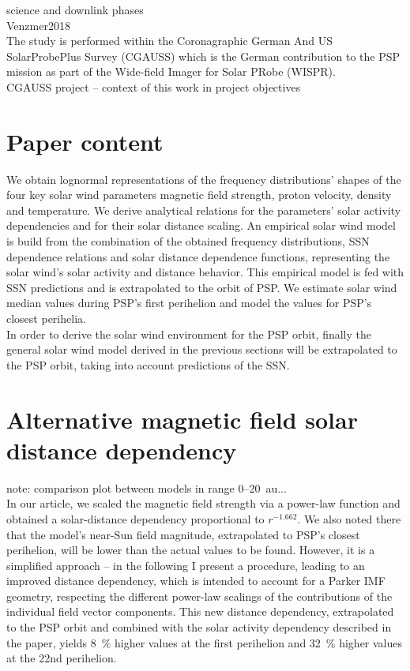 science and downlink phases\\


Venzmer2018\\
The study is performed within the Coronagraphic German And US SolarProbePlus Survey (CGAUSS) which is the German contribution to the PSP mission as part of the Wide-field Imager for Solar PRobe (WISPR).\\

CGAUSS project -- context of this work in project objectives\\



\section{Paper content}
We obtain lognormal representations of the frequency distributions’ shapes of the four key solar wind parameters magnetic field strength, proton velocity, density and temperature. We derive analytical relations for the parameters’ solar activity dependencies and for their solar distance scaling. An empirical solar wind model is build from the combination of the obtained frequency distributions, SSN dependence relations and solar distance dependence functions, representing the solar wind’s solar activity and distance behavior. This empirical model is fed with SSN predictions and is extrapolated to the orbit of PSP. We estimate solar wind median values during PSP’s first perihelion and model the values for PSP’s closest perihelia.\\

In order to derive the solar wind environment for the PSP orbit, finally the general solar wind model derived in the previous sections will be extrapolated to the PSP orbit, taking into account predictions of the SSN.\\


\section{Alternative magnetic field solar distance dependency}

note: comparison plot between models in range 0--20~au...\\

In our article, we scaled the magnetic field strength via a power-law function and obtained a solar-distance dependency proportional to $r^{-1.662}$. We also noted there that the model's near-Sun field magnitude, extrapolated to PSP's closest perihelion, will be lower than the actual values to be found. However, it is a simplified approach -- in the following I present a procedure, leading to an improved distance dependency, which is intended to account for a Parker IMF geometry,  respecting the different power-law scalings of the contributions of the individual field vector components. This new distance dependency, extrapolated to the PSP orbit and combined with the solar activity dependency described in the paper, yields \SI{8}{\%} higher values at the first perihelion and \SI{32}{\%} higher values at the 22nd perihelion.\\

